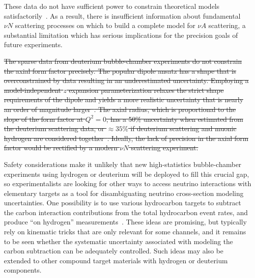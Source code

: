\documentclass{ar-1col}
\newcommand{\change}[1]{{\color{red} #1}}
\begin{document}
\change{These data do not have sufficient power to constrain theoretical models satisfactorily~\cite{Meyer:2016oeg, Hill:2017wgb}. As a result, there is insufficient information about fundamental $\nu N$ scattering processes on which to build a complete model for $\nu A$ scattering, a substantial limitation which has serious implications for the precision goals of future experiments.}

\sout{The sparse data from deuterium bubble-chamber experiments do not constrain
the axial form factor precisely.
The popular dipole ansatz has a shape that
is overconstrained by data resulting in an underestimated uncertainty.
Employing a model-independent $z$ expansion parameterization
relaxes the strict shape requirements of the dipole and yields
a more realistic uncertainty that is nearly an order of magnitude larger~\cite{Meyer:2016oeg}.
The axial radius, which is proportional to the slope of the form factor at $Q^2=0$,
has a 50\% uncertainty when estimated from the deuterium scattering data,
or $\approx35\%$ if deuterium scattering and muonic hydrogen are considered
together~\cite{Hill:2017wgb}.
Ideally, the lack of precision in the axial form factor would
be rectified by a modern $\nu N$ scattering experiment.}

Safety considerations make it unlikely that new high-statistics bubble-chamber experiments using
hydrogen or deuterium will be deployed to fill this crucial gap,
so experimentalists are looking for other ways to access neutrino interactions
with elementary targets as a tool for disambiguating neutrino cross-section modeling uncertainties.
One possibility is to use various hydrocarbon targets to subtract the carbon interaction contributions from
the total hydrocarbon event rates, and produce ``on hydrogen'' measurements~\cite{PhysRevD.92.051302, PhysRevD.101.092003, Hamacher-Baumann:2020ogq, DUNE:2021tad, Cai:2021vkc}.
These ideas are promising, but typically rely on kinematic tricks that are only relevant for some channels, and it remains to be seen whether the systematic uncertainty associated with modeling the carbon subtraction can be adequately controlled. Such ideas may also be extended to other compound target materials with hydrogen or deuterium components.
\end{document}
